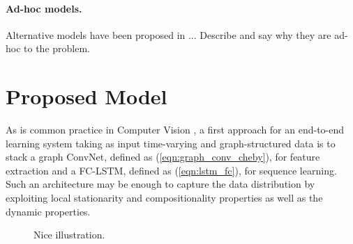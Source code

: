 \documentclass{article} %
\newcommand{\eqnref}[1]{(\ref{eqn:#1})}
\newcommand{\todo}[1]{{\color{red} #1 }}
\begin{document}
\paragraph{Ad-hoc models.} Alternative models have been proposed \todo{in ...
Describe and say why they are ad-hoc to the problem.}

\section{Proposed Model}


As is common practice in Computer Vision \citep{cnnlstm1, cnnlstm2, cnnlstm3},
a first approach for an end-to-end learning system taking as input time-varying
and graph-structured data is to stack a graph ConvNet, defined as
\eqnref{graph_conv_cheby}, for feature extraction and a FC-LSTM, defined as
\eqnref{lstm_fc}, for sequence learning. Such an architecture may be enough to
capture the data distribution by exploiting local stationarity and
compositionality properties as well as the dynamic properties.

\begin{figure}[ht]
	\centering
	\fbox{\rule[-.5cm]{0cm}{5cm} \rule[-.5cm]{\linewidth}{0cm}}
	\caption{\todo{Nice illustration.}}
\end{figure}
\end{document}
